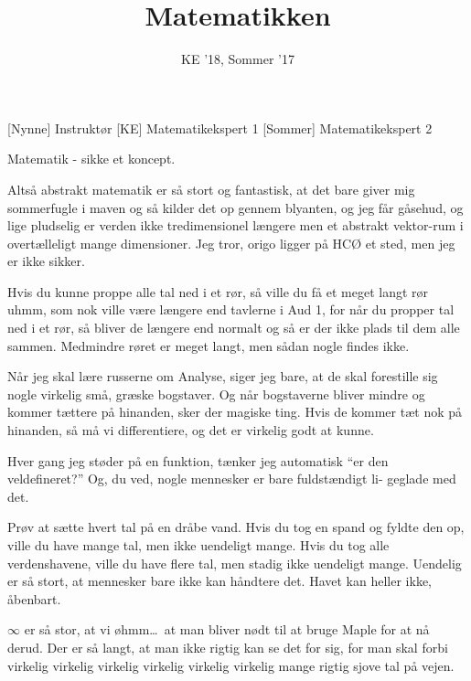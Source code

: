 \documentclass[a4paper,11pt]{article}
\title{Matematikken}
\author{KE '18, Sommer '17}
\begin{document}
\maketitle

\begin{roles}
[Nynne] Instruktør
[KE] Matematikekspert 1
[Sommer] Matematikekspert 2
\end{roles}

\begin{sketch}

 Matematik - sikke et koncept.

 Altså abstrakt matematik er så stort og fantastisk, at det bare giver mig sommerfugle i maven og så kilder det op gennem blyanten, og jeg får gåsehud, og lige pludselig er verden ikke tredimensionel længere men et abstrakt vektor-rum i overtælleligt mange dimensioner. Jeg tror, origo ligger på HCØ et sted, men jeg er ikke sikker.

 Hvis du kunne proppe alle tal ned i et rør, så ville du få et meget langt rør uhmm, som nok ville være længere end tavlerne i Aud 1, for når du propper tal ned i et rør, så bliver de længere end normalt og så er der ikke plads til dem alle sammen. Medmindre røret er meget langt, men sådan nogle findes ikke.

 Når jeg skal lære russerne om Analyse, siger jeg bare, at de skal forestille sig nogle virkelig små, græske bogstaver. Og når bogstaverne bliver mindre og kommer tættere på hinanden, sker der magiske ting. Hvis de kommer tæt nok på hinanden, så må vi differentiere, og det er virkelig godt at kunne.

 Hver gang jeg støder på en funktion, tænker jeg automatisk “er den veldefineret?” Og, du ved, nogle mennesker er bare fuldstændigt li- geglade med det.

 Prøv at sætte hvert tal på en dråbe vand. Hvis du tog en spand og fyldte den op, ville du have mange tal, men ikke uendeligt mange. Hvis du tog alle verdenshavene, ville du have flere tal, men stadig ikke uendeligt mange. Uendelig er så stort, at mennesker bare ikke kan håndtere det. Havet kan heller ikke, åbenbart.

 $\infty$ er så stor, at vi øhmm\ldots\ at man bliver nødt til at bruge Maple for at nå derud. Der er så langt, at man ikke rigtig kan se det for sig, for man skal forbi virkelig virkelig virkelig virkelig virkelig virkelig mange rigtig sjove tal på vejen.


\end{sketch}
\end{document}
